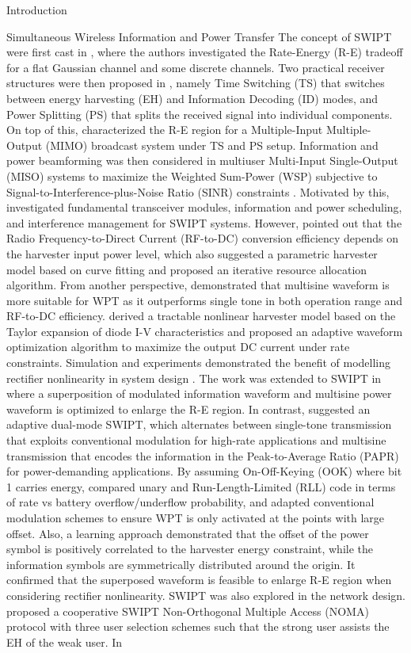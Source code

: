 \documentclass{IEEEtran}
\begin{document}
\begin{section}{Introduction}
\begin{subsection}{Simultaneous Wireless Information and Power Transfer}
		The concept of SWIPT were first cast in \cite{Varshney2008}, where the authors investigated the Rate-Energy (R-E) tradeoff for a flat Gaussian channel and some discrete channels. Two practical receiver structures were then proposed in \cite{Zhou2013}, namely Time Switching (TS) that switches between energy harvesting (EH) and Information Decoding (ID) modes, and Power Splitting (PS) that splits the received signal into individual components. On top of this, \cite{Zhang2013} characterized the R-E region for a Multiple-Input Multiple-Output (MIMO) broadcast system under TS and PS setup. Information and power beamforming was then considered in multiuser Multi-Input Single-Output (MISO) systems to maximize the Weighted Sum-Power (WSP) subjective to Signal-to-Interference-plus-Noise Ratio (SINR) constraints \cite{Xu2014}. Motivated by this, \cite{Krikidis2014} investigated fundamental transceiver modules, information and power scheduling, and interference management for SWIPT systems. However, \cite{Boshkovska2015} pointed out that the Radio Frequency-to-Direct Current (RF-to-DC) conversion efficiency depends on the harvester input power level, which also suggested a parametric harvester model based on curve fitting and proposed an iterative resource allocation algorithm. From another perspective, \cite{Trotter2009,Boaventura2011} demonstrated that multisine waveform is more suitable for WPT as it outperforms single tone in both operation range and RF-to-DC efficiency. \cite{Clerckx2016a} derived a tractable nonlinear harvester model based on the Taylor expansion of diode I-V characteristics and proposed an adaptive waveform optimization algorithm to maximize the output DC current under rate constraints. Simulation and experiments demonstrated the benefit of modelling rectifier nonlinearity in system design \cite{Kim2019,Kim2019a}. The work was extended to SWIPT in \cite{Clerckx2018} where a superposition of modulated information waveform and multisine power waveform is optimized to enlarge the R-E region. In contrast, \cite{Park2018} suggested an adaptive dual-mode SWIPT, which alternates between single-tone transmission that exploits conventional modulation for high-rate applications and multisine transmission that encodes the information in the Peak-to-Average Ratio (PAPR) for power-demanding applications. By assuming On-Off-Keying (OOK) where bit 1 carries energy, \cite{Hu2019} compared unary and Run-Length-Limited (RLL) code in terms of rate vs battery overflow/underflow probability, and adapted conventional modulation schemes to ensure WPT is only activated at the points with large offset. Also, a learning approach \cite{Varasteh2019c} demonstrated that the offset of the power symbol is positively correlated to the harvester energy constraint, while the information symbols are symmetrically distributed around the origin. It confirmed that the superposed waveform is feasible to enlarge R-E region when considering rectifier nonlinearity. SWIPT was also explored in the network design. \cite{Liu2016} proposed a cooperative SWIPT Non-Orthogonal Multiple Access (NOMA) protocol with three user selection schemes such that the strong user assists the EH of the weak user. In 
\end{subsection}
\end{section}
\end{document}
